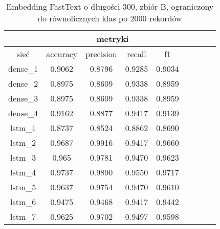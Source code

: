 \begin{table}[p]  \centering
    \caption{Embedding FastText o długości 300, zbiór B, ograniczony do \label{tab:wyniki_fasttext_B_lim}
        równolicznych klas po 2000 rekordów}
        \label{tab:wyniki_300_eks3}
        \begin{tabular} {|c|c|c|c|c|c|c|c|c| }    \hline
                 & \multicolumn{4}{c|}{metryki}                                                                                        \\ \hline
        sieć     & accuracy                     & precision                  & recall                     & f1                         \\ \hline
        dense\_1 & 0.9062                       & 0.8796                     & 0.9285                     & 0.9034                     \\ \hline
        dense\_2 & 0.8975                       & 0.8609                     & 0.9338                     & 0.8959                     \\ \hline
        dense\_3 & 0.8975                       & 0.8609                     & 0.9338                     & 0.8959                     \\ \hline
        dense\_4 & 0.9162                       & 0.8877                     & 0.9417                     & 0.9139                     \\ \hline
        lstm\_1  & 0.8737                       & 0.8524                     & 0.8862                     & 0.8690                     \\ \hline
        lstm\_2  & 0.9687                       & 0.9916                     & 0.9417                     & 0.9660                     \\ \hline
        lstm\_3  & 0.965                        & 0.9781                     & 0.9470                     & 0.9623                     \\ \hline
        lstm\_4  & 0.9737                       & 0.9890                     & 0.9550                     & 0.9717                     \\ \hline
        lstm\_5  & 0.9637                       & 0.9754                     & 0.9470                     & 0.9610                     \\ \hline
        lstm\_6  & 0.9475                       & 0.9468                     & 0.9417                     & 0.9442                     \\ \hline
        lstm\_7  & 0.9625                       & 0.9702                     & 0.9497                     & 0.9598                     \\ \hline

\end{tabular}
\end{table}
